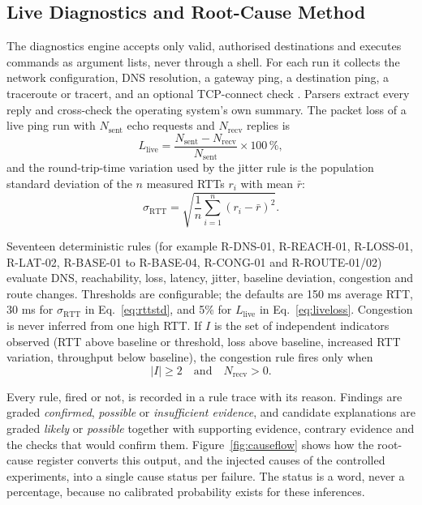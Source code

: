 \documentclass[12pt,a4paper]{report}
\numberwithin{equation}{chapter}
\begin{document}
\subsection{Live Diagnostics and Root-Cause Method}
The diagnostics engine accepts only valid, authorised destinations and executes commands as argument lists, never through a shell. For each run it collects the network configuration, DNS resolution, a gateway ping, a destination ping, a traceroute or tracert, and an optional TCP-connect check \cite{python_socket}. Parsers extract every reply and cross-check the operating system's own summary. The packet loss of a live ping run with $N_{\mathrm{sent}}$ echo requests and $N_{\mathrm{recv}}$ replies is
\begin{equation}
L_{\mathrm{live}} = \frac{N_{\mathrm{sent}} - N_{\mathrm{recv}}}{N_{\mathrm{sent}}} \times 100\,\%,
\label{eq:liveloss}
\end{equation}
and the round-trip-time variation used by the jitter rule is the population standard deviation of the $n$ measured RTTs $r_i$ with mean $\bar r$:
\begin{equation}
\sigma_{\mathrm{RTT}} = \sqrt{\frac{1}{n}\sum_{i=1}^{n}\left(r_i-\bar r\right)^2}.
\label{eq:rttstd}
\end{equation}

Seventeen deterministic rules (for example R-DNS-01, R-REACH-01, R-LOSS-01, R-LAT-02, R-BASE-01 to R-BASE-04, R-CONG-01 and R-ROUTE-01/02) evaluate DNS, reachability, loss, latency, jitter, baseline deviation, congestion and route changes. Thresholds are configurable; the defaults are 150 ms average RTT, 30 ms for $\sigma_{\mathrm{RTT}}$ in Eq.~\eqref{eq:rttstd}, and 5\% for $L_{\mathrm{live}}$ in Eq.~\eqref{eq:liveloss}. Congestion is never inferred from one high RTT. If $I$ is the set of independent indicators observed (RTT above baseline or threshold, loss above baseline, increased RTT variation, throughput below baseline), the congestion rule fires only when
\begin{equation}
|I| \ge 2 \quad\text{and}\quad N_{\mathrm{recv}} > 0.
\label{eq:congestion}
\end{equation}

Every rule, fired or not, is recorded in a rule trace with its reason. Findings are graded \emph{confirmed}, \emph{possible} or \emph{insufficient evidence}, and candidate explanations are graded \emph{likely} or \emph{possible} together with supporting evidence, contrary evidence and the checks that would confirm them. Figure~\ref{fig:causeflow} shows how the root-cause register converts this output, and the injected causes of the controlled experiments, into a single cause status per failure. The status is a word, never a percentage, because no calibrated probability exists for these inferences.
\end{document}
